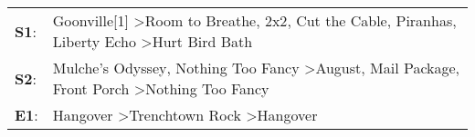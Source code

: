 \begin{supertabular}{p{0.03\textwidth}p{0.92\textwidth}}
 \textbf{S1}:  &  Goonville[1]\textsuperscript{} \textgreater \enspace Room to Breathe\textsuperscript{}, \enspace 2x2\textsuperscript{}, \enspace Cut the Cable\textsuperscript{}, \enspace Piranhas\textsuperscript{}, \enspace Liberty Echo\textsuperscript{} \textgreater \enspace Hurt Bird Bath\textsuperscript{}  \enspace  \\
 \textbf{S2}:  &                             Mulche's Odyssey\textsuperscript{}, \enspace Nothing Too Fancy\textsuperscript{} \textgreater \enspace August\textsuperscript{}, \enspace Mail Package\textsuperscript{}, \enspace Front Porch\textsuperscript{} \textgreater \enspace Nothing Too Fancy\textsuperscript{}  \enspace  \\
 \textbf{E1}:  &                                                                                                                                                                    Hangover\textsuperscript{} \textgreater \enspace Trenchtown Rock\textsuperscript{} \textgreater \enspace Hangover\textsuperscript{}  \enspace  \\
\end{supertabular}
